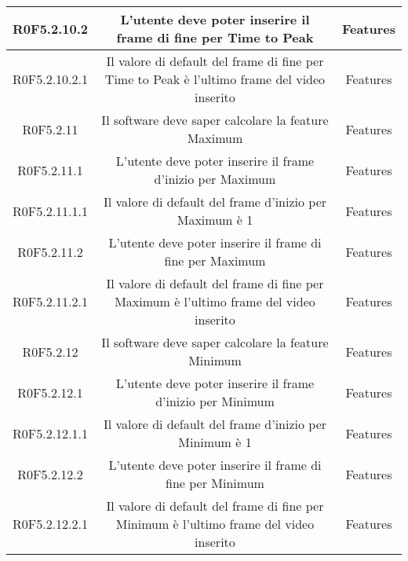 \begin{center}
\begin{longtable}{|c|c|c|}
\hline
R0F5.2.10.2   & \parbox[t]{\larghezza}{L'utente deve poter inserire il frame di fine per Time to Peak}  & \parbox[t]{\dimFonti}{ Features \\} \\
\hline
R0F5.2.10.2.1   & \parbox[t]{\larghezza}{Il valore di default del frame di fine per Time to Peak è l'ultimo frame del video inserito}  & \parbox[t]{\dimFonti}{ Features \\} \\
\hline
R0F5.2.11   & \parbox[t]{\larghezza}{Il software deve saper calcolare la feature\glossario{} Maximum}  & \parbox[t]{\dimFonti}{ Features \\} \\
\hline
R0F5.2.11.1   & \parbox[t]{\larghezza}{L'utente deve poter inserire il frame d'inizio per Maximum}  & \parbox[t]{\dimFonti}{ Features \\} \\
\hline
R0F5.2.11.1.1   & \parbox[t]{\larghezza}{Il valore di default del frame d'inizio per Maximum è 1}  & \parbox[t]{\dimFonti}{ Features \\} \\
\hline
R0F5.2.11.2   & \parbox[t]{\larghezza}{L'utente deve poter inserire il frame di fine per Maximum}  & \parbox[t]{\dimFonti}{ Features \\} \\
\hline
R0F5.2.11.2.1   & \parbox[t]{\larghezza}{Il valore di default del frame di fine per Maximum è l'ultimo frame del video inserito}  & \parbox[t]{\dimFonti}{ Features \\} \\
\hline
R0F5.2.12   & \parbox[t]{\larghezza}{Il software deve saper calcolare la feature\glossario {} Minimum}  & \parbox[t]{\dimFonti}{ Features \\} \\
\hline
R0F5.2.12.1   & \parbox[t]{\larghezza}{L'utente deve poter inserire il frame d'inizio per Minimum}  & \parbox[t]{\dimFonti}{ Features \\} \\
\hline
R0F5.2.12.1.1   & \parbox[t]{\larghezza}{Il valore di default del frame d'inizio per Minimum è 1}  & \parbox[t]{\dimFonti}{ Features \\} \\
\hline
R0F5.2.12.2   & \parbox[t]{\larghezza}{L'utente deve poter inserire il frame di fine per Minimum}  & \parbox[t]{\dimFonti}{ Features \\} \\
\hline
R0F5.2.12.2.1   & \parbox[t]{\larghezza}{Il valore di default del frame di fine per Minimum è l'ultimo frame del video inserito}  & \parbox[t]{\dimFonti}{ Features \\} \\

\end{longtable}
\end{center}
